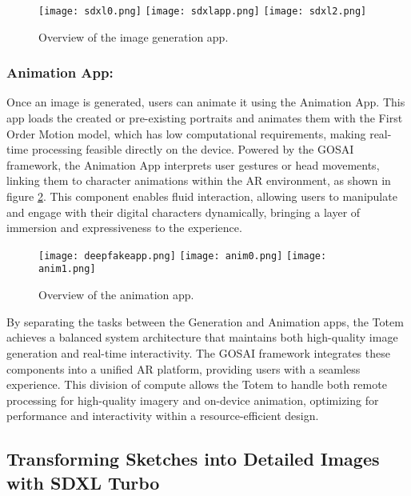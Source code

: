 \begin{figure}[!h]
    \centering
    \texttt{[image: sdxl0.png]}
    \texttt{[image: sdxlapp.png]}
    \texttt{[image: sdxl2.png]}
    \caption{Overview of the image generation app.}
    \vspace{0.1cm}
    \label{fig:imgenapp}
\end{figure}

\subsubsection{Animation App:}

Once an image is generated, users can animate it using the Animation App.
This app loads the created or pre-existing portraits and animates them with the First Order Motion model, which has low computational requirements, making real-time processing feasible directly on the device.
Powered by the GOSAI framework, the Animation App interprets user gestures or head movements, linking them to character animations within the AR environment, as shown in figure \ref{fig:deepfakeapp}.
This component enables fluid interaction, allowing users to manipulate and engage with their digital characters dynamically, bringing a layer of immersion and expressiveness to the experience.

\begin{figure}[!h]
    \centering
    \texttt{[image: deepfakeapp.png]}
    \texttt{[image: anim0.png]}
    \texttt{[image: anim1.png]}
    \caption{Overview of the animation app.}
    \vspace{0.1cm}
    \label{fig:deepfakeapp}
\end{figure}

By separating the tasks between the Generation and Animation apps, the Totem achieves a balanced system architecture that maintains both high-quality image generation and real-time interactivity.
The GOSAI framework integrates these components into a unified AR platform, providing users with a seamless experience.
This division of compute allows the Totem to handle both remote processing for high-quality imagery and on-device animation, optimizing for performance and interactivity within a resource-efficient design.

\subsection{Transforming Sketches into Detailed Images with SDXL Turbo}

